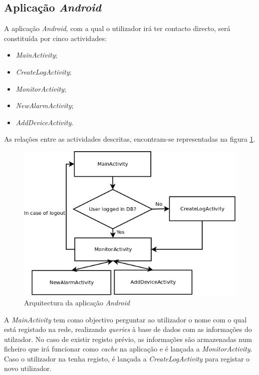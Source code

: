 \documentclass[a4paper]{article}
\begin{document}
\subsection{Aplicação \textit{Android}}

A aplicação \textit{Android}, com a qual o utilizador irá ter contacto directo, será constituída por cinco actividades:

\begin{itemize}
\item \textit{MainActivity};
\item \textit{CreateLogActivity};
\item \textit{MonitorActivity};
\item \textit{NewAlarmActivity};
\item \textit{AddDeviceActivity}.
\end{itemize}

As relações entre as actividades descritas, encontram-se representadas na figura \ref{fig:app_android_geral}.

\vspace{5mm}

\begin{figure}[hb]
  \centering
  \includegraphics[scale=0.40]{App_geral.png}
  \caption{Arquitectura da aplicação \textit{Android}}
  \label{fig:app_android_geral}
\end{figure}

A \textit{MainActivity} tem como objectivo perguntar ao utilizador o nome com o qual está registado na rede, realizando \textit{queries} à base de dados com as informações do utilzador. No caso de existir registo prévio, as informações são armazenadas num ficheiro que irá funcionar como \textit{cache} na aplicação e é lançada a \textit{MonitorActivity}. Caso o utilizador na tenha registo, é lançada a \textit{CreateLogActivity} para registar o novo utilizador. 
\end{document}
